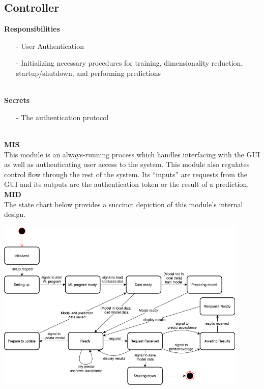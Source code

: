 \documentclass[titlepage]{article}
\begin{document}
\subsection{Controller}
\textbf{Responsibilities}
\begin{itemize}
	\item[-] User Authentication
	\item[-] Initializing necessary procedures for training, dimensionality reduction, startup/shutdown, and performing predictions
\end{itemize}~\\
\textbf{Secrets}
\begin{itemize}
	\item[-] The authentication protocol
\end{itemize}~\\
\textbf{MIS}\\[2mm]
This module is an always-running process which handles interfacing with the GUI as well as authenticating user access to the system. This module also regulates control flow through the rest of the system. Its ``inputs'' are requests from the GUI and its outputs are the authentication token or the result of a prediction.\\[6mm]
\newpage
\noindent\textbf{MID}\\[2mm]
The state chart below provides a succinct depiction of this module's internal design.\\
\begin{center}
	\includegraphics[width=0.9\textwidth]{AdvolControllerStateChart.png}
\label{fig:controller state chart}
\end{center}~\\
\end{document}
